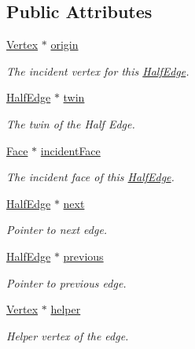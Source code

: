 \subsection*{Public Attributes}
\begin{DoxyCompactItemize}
\item 
\mbox{\label{classHalfEdge_a8c90288f66768884f42b0588055eb4bf}} 
\hyperlink{classVertex}{Vertex} $\ast$ \hyperlink{classHalfEdge_a8c90288f66768884f42b0588055eb4bf}{origin}
\begin{DoxyCompactList}\small\item\em The incident vertex for this \hyperlink{classHalfEdge}{Half\+Edge}. \end{DoxyCompactList}\item 
\mbox{\label{classHalfEdge_a37e7696a7131767a0c76e45ed69be4c5}} 
\hyperlink{classHalfEdge}{Half\+Edge} $\ast$ \hyperlink{classHalfEdge_a37e7696a7131767a0c76e45ed69be4c5}{twin}
\begin{DoxyCompactList}\small\item\em The twin of the Half Edge. \end{DoxyCompactList}\item 
\mbox{\label{classHalfEdge_a3d0414cecae8de073ce0d8b3a2c1b846}} 
\hyperlink{classFace}{Face} $\ast$ \hyperlink{classHalfEdge_a3d0414cecae8de073ce0d8b3a2c1b846}{incident\+Face}
\begin{DoxyCompactList}\small\item\em The incident face of this \hyperlink{classHalfEdge}{Half\+Edge}. \end{DoxyCompactList}\item 
\mbox{\label{classHalfEdge_a5918db069bb8b4a89e471c01a14fc6e1}} 
\hyperlink{classHalfEdge}{Half\+Edge} $\ast$ \hyperlink{classHalfEdge_a5918db069bb8b4a89e471c01a14fc6e1}{next}
\begin{DoxyCompactList}\small\item\em Pointer to next edge. \end{DoxyCompactList}\item 
\mbox{\label{classHalfEdge_a0050591d6482ebaf8dde9b792a0109a7}} 
\hyperlink{classHalfEdge}{Half\+Edge} $\ast$ \hyperlink{classHalfEdge_a0050591d6482ebaf8dde9b792a0109a7}{previous}
\begin{DoxyCompactList}\small\item\em Pointer to previous edge. \end{DoxyCompactList}\item 
\mbox{\label{classHalfEdge_afa4715b95706d513ac343f42e2dc067e}} 
\hyperlink{classVertex}{Vertex} $\ast$ \hyperlink{classHalfEdge_afa4715b95706d513ac343f42e2dc067e}{helper}
\begin{DoxyCompactList}\small\item\em Helper vertex of the edge. \end{DoxyCompactList}\end{DoxyCompactItemize}
